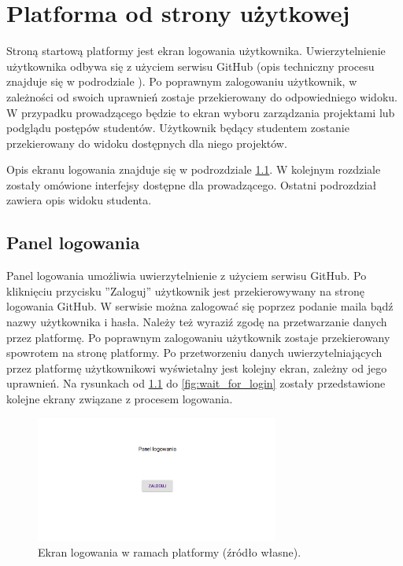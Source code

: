 \chapter{Platforma od strony użytkowej}
\label{chapter:interfaces}

Stroną startową platformy jest ekran logowania użytkownika.
Uwierzytelnienie użytkownika odbywa się z użyciem serwisu GitHub (opis techniczny procesu znajduje się w podrodziale \label{authorization}).
Po poprawnym zalogowaniu użytkownik, w zależności od swoich uprawnień zostaje przekierowany do odpowiedniego widoku.
W przypadku prowadzącego będzie to ekran wyboru zarządzania projektami lub podglądu postępów studentów.
Użytkownik będący studentem zostanie przekierowany do widoku dostępnych dla niego projektów.

Opis ekranu logowania znajduje się w podrozdziale \ref{fe_login}.
W kolejnym rozdziale zostały omówione interfejsy dostępne dla prowadzącego.
Ostatni podrozdział zawiera opis widoku studenta.

\section{Panel logowania}
\label{fe_login}

Panel logowania umożliwia uwierzytelnienie z użyciem serwisu GitHub.
Po kliknięciu przycisku ”Zaloguj” użytkownik jest przekierowywany na stronę logowania GitHub.
W serwisie można zalogować się poprzez podanie maila bądź nazwy użytkownika i hasła.
Należy też wyraziź zgodę na przetwarzanie danych przez platformę.
Po poprawnym zalogowaniu użytkownik zostaje przekierowany spowrotem na stronę platformy.
Po przetworzeniu danych uwierzytelniających przez platformę użytkownikowi wyświetalny jest kolejny ekran, zależny od jego uprawnień.
Na rysunkach od \ref{fig:log_in_butoon} do \ref{fig:wait_for_login} zostały przedstawione kolejne ekrany związane z procesem logowania.

\begin{figure}[h]
    \centering
    \includegraphics[width = 8cm]{chapter04/log_in_button.png}
    \caption{Ekran logowania w ramach platformy (źródło własne).}
    \label{fig:log_in_butoon}
\end{figure}

